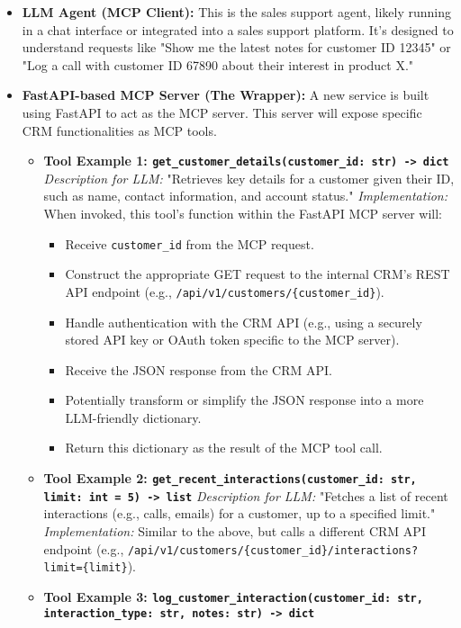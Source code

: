 \begin{itemize}
    \item \textbf{LLM Agent (MCP Client):} This is the sales support agent, likely running in a chat interface or integrated into a 
    sales support platform. It's designed to understand requests like "Show me the latest notes for customer ID 12345" or 
    "Log a call with customer ID 67890 about their interest in product X."
    \item \textbf{FastAPI-based MCP Server (The Wrapper):} A new service is built using FastAPI to act as the MCP server.
     This server will expose specific CRM functionalities as MCP tools.
    \begin{itemize}
        \item \textbf{Tool Example 1: 
        \texttt{get\_customer\_details(customer\_id: str) -> dict}}
        \textit{Description for LLM:} "Retrieves key details for a customer given their ID, such as name, contact information, and account status."
        \textit{Implementation:} When invoked, this tool's function within the FastAPI MCP server will:
        \begin{itemize}
            \item Receive \texttt{customer\_id} from the MCP request.
            \item Construct the appropriate GET request to the internal CRM's REST API endpoint (e.g., \texttt{/api/v1/customers/\{customer\_id\}}).
            \item Handle authentication with the CRM API (e.g., using a securely stored API key or OAuth token specific to the MCP server).
            \item Receive the JSON response from the CRM API.
            \item Potentially transform or simplify the JSON response into a more LLM-friendly dictionary.
            \item Return this dictionary as the result of the MCP tool call.
        \end{itemize}
        \item \textbf{Tool Example 2: \texttt{get\_recent\_interactions(customer\_id: str, limit: int = 5) -> list}}
        \textit{Description for LLM:} "Fetches a list of recent interactions (e.g., calls, emails) for a customer, up to a specified limit."
        \textit{Implementation:} Similar to the above, but calls a different CRM API endpoint 
        (e.g., \texttt{/api/v1/customers/\{customer\_id\}/interactions?limit=\{limit\}}).
        \item \textbf{Tool Example 3: \texttt{log\_customer\_interaction(customer\_id: str, interaction\_type: str, notes: str) -> dict}}

\end{itemize}
\end{itemize}
